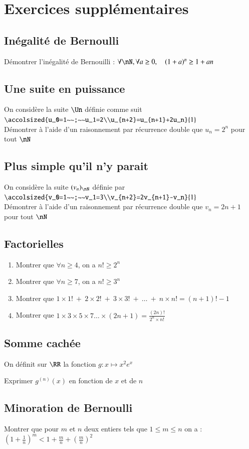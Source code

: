 \documentclass[oneside,12pt]{article}          %
\begin{document}
\section{Exercices supplémentaires}

\subsection{Inégalité de Bernoulli}
Démontrer l'inégalité de Bernouilli : $\forall\nN, \forall a\geq0,\quad (1+a)^n\geq1+an$



\subsection{Une suite en puissance}

On considère la suite $\Un$ définie comme suit $\accolsized{u_0=1~~;~~u_1=2\\u_{n+2}=u_{n+1}+2u_n}{1}$\\[5pt]
Démontrer à l'aide d'un raisonnement par récurrence double que $u_n=2^n$ pour tout $\nN$


\subsection{Plus simple qu'il n'y parait}

On considère la suite $(v_n)_{\nN}$ définie par $\accolsized{v_0=1~~;~~v_1=3\\v_{n+2}=2v_{n+1}-v_n}{1}$\\[5pt]
Démontrer à l'aide d'un raisonnement par récurrence double que $v_n=2n+1$ pour tout $\nN$



\subsection{Factorielles}
\begin{enumerate}
    \item Montrer que $\forall n\geq4$, on a $n!\geq2^n$
    \item Montrer que $\forall n\geq7$, on a $n!\geq3^n$
    \item Montrer que $1\times1!~+~2\times2!~+~3\times3!~+~\ldots~+~n\times n!=(n+1)!-1$
    \item Montrer que $1\times3\times5\times7\ldots\times(2n+1)=\frac{(2n)!}{2^n\times n!}$
\end{enumerate}



\subsection{Somme cachée}
On définit sur $\RR$ la fonction $g:x\mapsto x^2e^x$

Exprimer $g^{(n)}(x)$ en fonction de $x$ et de $n$



\subsection{Minoration de Bernoulli}
Montrer que pour $m$ et $n$ deux entiers tels que $1\leq m\leq n$ on a : $\left(1+\frac{1}{n}\right)^m<1+\frac{m}{n}+\left(\frac{m}{n}\right)^2$
\end{document}
